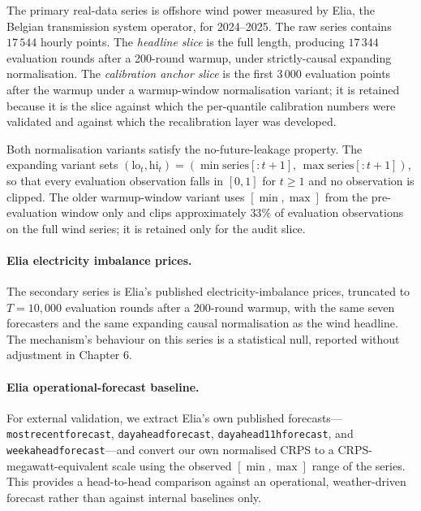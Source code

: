 \documentclass[
  11pt,
  a4paper,
  oneside]{report}
\begin{document}
The primary real-data series is offshore wind power measured by Elia,
the Belgian transmission system operator, for 2024--2025. The raw series
contains \(17\,544\) hourly points. The \emph{headline slice} is the
full length, producing \(17\,344\) evaluation rounds after a 200-round
warmup, under strictly-causal expanding normalisation. The
\emph{calibration anchor
slice} is the first \(3\,000\) evaluation points after the warmup under
a warmup-window normalisation variant; it is retained because it is the
slice against which the per-quantile calibration numbers were validated
and against which the recalibration layer was developed.

Both normalisation variants satisfy the no-future-leakage property. The
expanding variant sets
\((\mathrm{lo}_t, \mathrm{hi}_t) = (\min \mathrm{series}[:t+1],\,
\max \mathrm{series}[:t+1])\), so that every evaluation observation
falls in \([0, 1]\) for \(t \geq 1\) and no observation is clipped. The
older warmup-window variant uses \([\min, \max]\) from the
pre-evaluation window only and clips approximately \(33\%\) of
evaluation observations on the full wind series; it is retained only for
the audit slice.

\paragraph{Elia electricity imbalance prices.}

The secondary series is Elia's published electricity-imbalance prices,
truncated to \(T = 10{,}000\) evaluation rounds after a 200-round
warmup, with the same seven forecasters and the same expanding causal
normalisation as the wind headline. The mechanism's behaviour on this
series is a statistical null, reported without adjustment in Chapter 6.

\paragraph{Elia operational-forecast baseline.}

For external validation, we extract Elia's own published forecasts---
\texttt{mostrecentforecast}, \texttt{dayaheadforecast},
\texttt{dayahead11hforecast}, and \texttt{weekaheadforecast}---and
convert our own normalised CRPS to a CRPS-megawatt-equivalent scale
using the observed \([\min, \max]\) range of the series. This provides a
head-to-head comparison against an operational, weather-driven forecast
rather than against internal baselines only.
\end{document}
